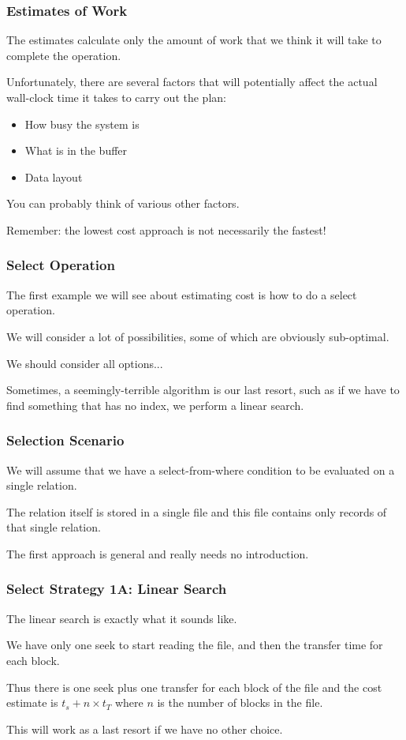 \begin{frame}
\frametitle{Estimates of Work}

The estimates calculate only the amount of work that we think it will take to complete the operation. 

Unfortunately, there are several factors that will potentially affect the actual wall-clock time it takes to carry out the plan:

\begin{itemize}
	\item How busy the system is
	\item What is in the buffer
	\item Data layout
\end{itemize}

You can probably think of various other factors.

Remember: the lowest cost approach is not necessarily the fastest!

\end{frame}

\begin{frame}
\frametitle{Select Operation}

The first example we will see about estimating cost is how to do a select operation. 

We will consider a lot of possibilities, some of which are obviously sub-optimal. 

We should consider all options... 

Sometimes, a seemingly-terrible algorithm is our last resort, such as if we have to find something that has no index, we perform a linear search.


\end{frame}


\begin{frame}
\frametitle{Selection Scenario}

We will assume that we have a select-from-where condition to be evaluated on a single relation.  

The relation itself is stored in a single file and this file contains only records of that single relation. 

The first approach is general and really needs no introduction.

\end{frame}



\begin{frame}
\frametitle{Select Strategy 1A: Linear Search}

The linear search is exactly what it sounds like.

We have only one seek to start reading the file, and then the transfer time for each block. 

Thus there is one seek plus one transfer for each block of the file and the cost estimate is $t_{s} + n \times t_{T}$ where $n$ is the number of blocks in the file.

This will work as a last resort if we have no other choice.

\end{frame}


